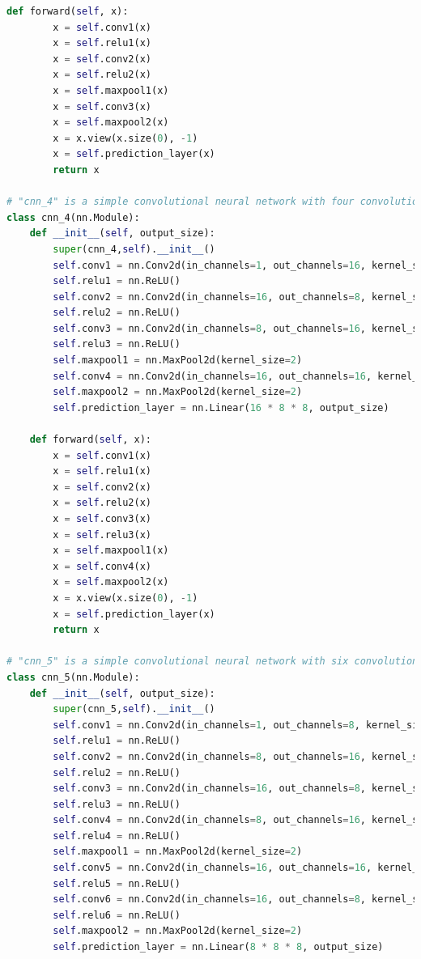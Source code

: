 \documentclass[3p,times,procedia]{elsarticle}
\begin{document}
\begin{lstlisting}[language=Python]
    def forward(self, x):
        x = self.conv1(x)
        x = self.relu1(x)
        x = self.conv2(x)
        x = self.relu2(x)
        x = self.maxpool1(x)
        x = self.conv3(x)
        x = self.maxpool2(x)
        x = x.view(x.size(0), -1)
        x = self.prediction_layer(x)
        return x
    
# "cnn_4" is a simple convolutional neural network with four convolutional layers
class cnn_4(nn.Module):
    def __init__(self, output_size):
        super(cnn_4,self).__init__()
        self.conv1 = nn.Conv2d(in_channels=1, out_channels=16, kernel_size=3, padding=1)  # 1x32x32 -> 16x32x32
        self.relu1 = nn.ReLU()
        self.conv2 = nn.Conv2d(in_channels=16, out_channels=8, kernel_size=3, padding=1)  # 16x32x32 -> 8x32x32
        self.relu2 = nn.ReLU()
        self.conv3 = nn.Conv2d(in_channels=8, out_channels=16, kernel_size=5, padding=2)  # 8x32x32 -> 16x32x32
        self.relu3 = nn.ReLU()
        self.maxpool1 = nn.MaxPool2d(kernel_size=2)                                       # 16x32x32 -> 16x16x16
        self.conv4 = nn.Conv2d(in_channels=16, out_channels=16, kernel_size=5, padding=2) # 16x16x16 -> 16x16x16
        self.maxpool2 = nn.MaxPool2d(kernel_size=2)                                       # 16x16x16 -> 16x8x8
        self.prediction_layer = nn.Linear(16 * 8 * 8, output_size)                        # 16x8x8 -> 10

    def forward(self, x):
        x = self.conv1(x)
        x = self.relu1(x)
        x = self.conv2(x)
        x = self.relu2(x)
        x = self.conv3(x)
        x = self.relu3(x)
        x = self.maxpool1(x)
        x = self.conv4(x)
        x = self.maxpool2(x)
        x = x.view(x.size(0), -1)
        x = self.prediction_layer(x)
        return x
    
# "cnn_5" is a simple convolutional neural network with six convolutional layers
class cnn_5(nn.Module):
    def __init__(self, output_size):
        super(cnn_5,self).__init__()
        self.conv1 = nn.Conv2d(in_channels=1, out_channels=8, kernel_size=3, padding=1)   # 1x32x32 -> 8x32x32
        self.relu1 = nn.ReLU()
        self.conv2 = nn.Conv2d(in_channels=8, out_channels=16, kernel_size=3, padding=1)  # 8x32x32 -> 16x32x32
        self.relu2 = nn.ReLU()
        self.conv3 = nn.Conv2d(in_channels=16, out_channels=8, kernel_size=3, padding=1)  # 16x32x32 -> 8x32x32
        self.relu3 = nn.ReLU()
        self.conv4 = nn.Conv2d(in_channels=8, out_channels=16, kernel_size=3, padding=1)  # 8x32x32 -> 16x32x32
        self.relu4 = nn.ReLU()
        self.maxpool1 = nn.MaxPool2d(kernel_size=2)                                       # 16x32x32 -> 16x16x16
        self.conv5 = nn.Conv2d(in_channels=16, out_channels=16, kernel_size=3, padding=1) # 16x16x16 -> 16x16x16
        self.relu5 = nn.ReLU()
        self.conv6 = nn.Conv2d(in_channels=16, out_channels=8, kernel_size=3, padding=1)  # 16x16x16 -> 8x16x16 
        self.relu6 = nn.ReLU()
        self.maxpool2 = nn.MaxPool2d(kernel_size=2)                                       # 8x16x16 -> 8x8x8
        self.prediction_layer = nn.Linear(8 * 8 * 8, output_size)                         # 8x8x8 -> 10


\end{lstlisting}
\end{document}
